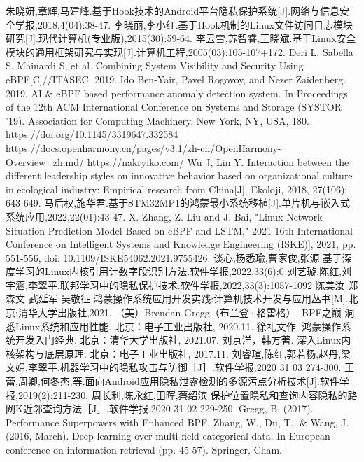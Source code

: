 \documentclass[12pt,a4paper]{ctexart}
\begin{document}
\newpage
\begin{thebibliography}{99}
  朱晓妍,章辉,马建峰.基于Hook技术的Android平台隐私保护系统[J].网络与信息安全学报,2018,4(04):38-47.
  李晓丽,李小红.基于Hook机制的Linux文件访问日志模块研究[J].现代计算机(专业版),2015(30):59-64.
  李云雪,苏智睿,王晓斌.基于Linux安全模块的通用框架研究与实现[J].计算机工程,2005(03):105-107+172.
  Deri L, Sabella S, Mainardi S, et al. Combining System Visibility and Security Using eBPF[C]//ITASEC. 2019.
  Ido Ben-Yair, Pavel Rogovoy, and Nezer Zaidenberg. 2019. AI \& eBPF based performance anomaly detection system. In Proceedings of the 12th ACM International Conference on Systems and Storage  (SYSTOR '19). Association for Computing Machinery, New York, NY, USA, 180. https://doi.org/10.1145/3319647.332584
  https://docs.openharmony.cn/pages/v3.1/zh-cn/OpenHarmony-Overview\_zh.md/
  https://nakryiko.com/
  Wu J, Lin Y. Interaction between the different leadership styles on innovative behavior based on organizational culture in ecological industry: Empirical research from China[J]. Ekoloji, 2018, 27(106): 643-649.
  马后权,施华君.基于STM32MP1的鸿蒙最小系统移植[J].单片机与嵌入式系统应用,2022,22(01):43-47.
  X. Zhang, Z. Liu and J. Bai, "Linux Network Situation Prediction Model Based on eBPF and LSTM," 2021 16th International Conference on Intelligent Systems and Knowledge Engineering (ISKE)], 2021, pp. 551-556, doi: 10.1109/ISKE54062.2021.9755426.
  谈心,杨悉瑜,曹家俊,张源.基于深度学习的Linux内核引用计数字段识别方法.软件学报,2022,33(6):0
  刘艺璇,陈红,刘宇涵,李翠平.联邦学习中的隐私保护技术.软件学报,2022,33(3):1057-1092
  陈美汝 郑森文 武延军 吴敬征.鸿蒙操作系统应用开发实践:计算机技术开发与应用丛书[M].北京:清华大学出版社,2021.
  （美）Brendan Gregg（布兰登·格雷格）. BPF之巅 洞悉Linux系统和应用性能. 北京：电子工业出版社, 2020.11.
  徐礼文作. 鸿蒙操作系统开发入门经典. 北京：清华大学出版社, 2021.07.
  刘京洋，韩方著. 深入Linux内核架构与底层原理. 北京：电子工业出版社, 2017.11.
  刘睿瑄,陈红,郭若杨,赵丹,梁文娟,李翠平.机器学习中的隐私攻击与防御［J］.软件学报,2020 31 03 274-300.
  王蕾,周卿,何冬杰,等.面向Android应用隐私泄露检测的多源污点分析技术[J].软件学报,2019(2):211-230.
  周长利,陈永红,田晖,蔡绍滨.保护位置隐私和查询内容隐私的路网K近邻查询方法［J］.软件学报,2020 31 02 229-250.
  Gregg, B. (2017). Performance Superpowers with Enhanced {BPF}.
  Zhang, W., Du, T., \& Wang, J. (2016, March). Deep learning over multi-field categorical data. In European conference on information retrieval (pp. 45-57). Springer, Cham.

\end{thebibliography}
\end{document}
